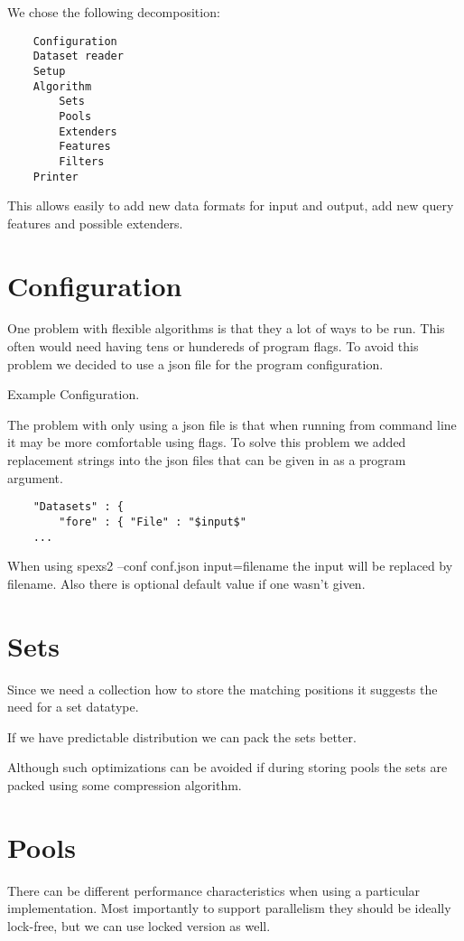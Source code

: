We chose the following decomposition:

\begin{verbatim}
	Configuration
	Dataset reader
	Setup
	Algorithm
		Sets
		Pools
		Extenders
		Features
		Filters
	Printer
\end{verbatim}

This allows easily to add new data formats for input and output, 
add new query features and possible extenders.

\section{Configuration}

One problem with flexible algorithms is that they a lot of ways to be run.
This often would need having tens or hundereds of program flags.
To avoid this problem we decided to use a json file for the program
configuration.

Example Configuration.

The problem with only using a json file is that when running from
command line it may be more comfortable using flags. To solve this problem
we added replacement strings into the json files that can be given in as
a program argument.

\begin{verbatim}
	"Datasets" : {
		"fore" : { "File" : "$input$"
	...
\end{verbatim}

When using spexs2 --conf conf.json input=filename the input will be
replaced by filename. Also there is optional default value if
one wasn't given.

\section{Sets}

Since we need a collection how to store the matching positions it suggests
the need for a set datatype.

If we have predictable distribution we can pack the sets better.

Although such optimizations can be avoided if during storing pools the sets are packed using some compression algorithm.

\section{Pools}

There can be different performance characteristics when using a particular implementation. Most importantly to support parallelism they should be ideally lock-free, but we can use locked version as well.

